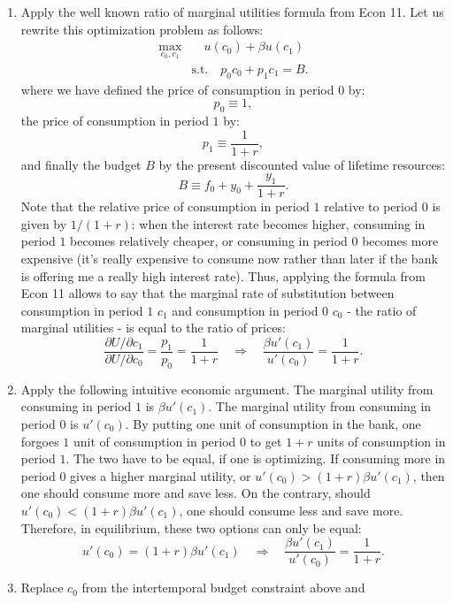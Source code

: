 \documentclass[]{book}
\theoremstyle{definition}
\theoremstyle{definition}
\theoremstyle{definition}
\theoremstyle{remark}
\begin{document}
\begin{enumerate}
\def\labelenumi{\arabic{enumi}.}
\item
  Apply the well known ratio of marginal utilities formula from Econ 11.
  Let us rewrite this optimization problem as follows: \[
  \begin{aligned} 
  \max_{c_{0},c_{1}} & \quad u(c_{0})+\beta u(c_{1}) \\
  & \text{s.t.} \quad p_0c_{0}+p_1 c_1=B.
  \end{aligned}
  \] where we have defined the price of consumption in period \(0\) by:
  \[p_0 \equiv 1,\] the price of consumption in period \(1\) by:
  \[p_1 \equiv \frac{1}{1+r},\] and finally the budget \(B\) by the
  present discounted value of lifetime resources:
  \[B \equiv f_{0}+y_{0}+\frac{y_{1}}{1+r}.\] Note that the relative
  price of consumption in period \(1\) relative to period \(0\) is given
  by \(1/(1+r)\): when the interest rate becomes higher, consuming in
  period \(1\) becomes relatively cheaper, or consuming in period \(0\)
  becomes more expensive (it's really expensive to consume now rather
  than later if the bank is offering me a really high interest rate).
  Thus, applying the formula from Econ 11 allows to say that the
  marginal rate of substitution between consumption in period \(1\)
  \(c_1\) and consumption in period \(0\) \(c_0\) - the ratio of
  marginal utilities - is equal to the ratio of prices:
  \[\frac{\partial U / \partial c_1}{\partial U / \partial c_0} = \frac{p_1}{p_0}= \frac{1}{1+r} \quad\Rightarrow\quad\frac{\beta u'(c_{1})}{u'(c_{0})}=\frac{1}{1+r}.\]
\item
  Apply the following intuitive economic argument. The marginal utility
  from consuming in period \(1\) is \(\beta u'(c_{1})\). The marginal
  utility from consuming in period \(0\) is \(u'(c_{0})\). By putting
  one unit of consumption in the bank, one forgoes \(1\) unit of
  consumption in period \(0\) to get \(1+r\) units of consumption in
  period \(1\). The two have to be equal, if one is optimizing. If
  consuming more in period \(0\) gives a higher marginal utility, or
  \(u'(c_{0})>(1+r)\beta u'(c_{1})\), then one should consume more and
  save less. On the contrary, should \(u'(c_{0})<(1+r)\beta u'(c_{1})\),
  one should consume less and save more. Therefore, in equilibrium,
  these two options can only be equal:
  \[u'(c_{0})=(1+r)\beta u'(c_{1})\quad\Rightarrow\quad\frac{\beta u'(c_{1})}{u'(c_{0})}=\frac{1}{1+r}.\]
\item
  Replace \(c_{0}\) from the intertemporal budget constraint above and

\end{enumerate}
\end{document}
